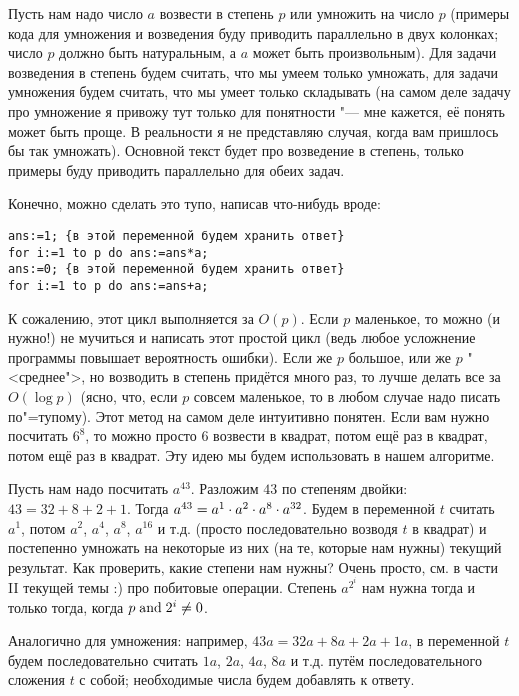 Пусть нам надо число $a$ возвести в степень $p$ или умножить на число $p$ (примеры кода для 
умножения и возведения буду приводить параллельно в двух колонках; число $p$ должно быть 
натуральным, а $a$ может быть произвольным). Для задачи возведения в степень будем считать, что мы умеем 
только умножать, для задачи умножения будем считать, что мы умеет только складывать (на самом деле 
задачу про умножение я привожу тут только для понятности "--- мне кажется, её понять может быть проще. В 
реальности я не представляю случая, когда вам пришлось бы так умножать). Основной текст будет про 
возведение в степень, только примеры буду приводить параллельно для обеих задач.

Конечно, можно сделать это тупо, написав что-нибудь вроде:

\begin{codesample}\begin{verbatim}
ans:=1; {в этой переменной будем хранить ответ}
for i:=1 to p do ans:=ans*a;
ans:=0; {в этой переменной будем хранить ответ}
for i:=1 to p do ans:=ans+a;
\end{verbatim}\end{codesample}

К сожалению, этот цикл выполняется за $O(p)$. Если $p$ маленькое, то можно (и нужно!) не мучиться и написать этот простой цикл 
(ведь любое усложнение программы повышает вероятность ошибки). Если же $p$ большое, или же $p$ 
"<среднее">, но возводить в степень придётся много раз, то лучше делать все за $O(\log p)$ (ясно, что, если $p$ совсем маленькое, то в 
любом случае надо писать по"=тупому). Этот метод на самом деле интуитивно понятен. Если вам нужно посчитать $6^8$, то можно просто $6$ 
возвести в квадрат, потом ещё раз в квадрат, потом ещё раз в квадрат. Эту идею мы будем использовать в нашем алгоритме.

Пусть нам надо посчитать $a^{43}$. Разложим $43$ по степеням двойки: $43 = 32 + 8 + 2 + 1$. Тогда 
$a^{43} \hm= a^1 \cdot a^2 \cdot a^8 \cdot a^{32}$. Будем в переменной $t$ считать $a^1$, потом $a^2$, 
$a^4$, $a^8$, $a^{16}$ и т.д. (просто последовательно возводя $t$ в квадрат) и постепенно 
умножать на некоторые из них (на те, которые нам нужны) текущий результат. Как проверить, 
какие степени нам нужны? Очень просто, см. в части II текущей темы :) про побитовые операции. 
Степень $a^{2^i}$ нам нужна тогда и только тогда, когда $p \mathrel{\mathrm{and}} 2^i \neq 0$.

{\small Аналогично для умножения: например, $43a=32a+8a+2a+1a$, в переменной $t$ будем 
последовательно считать $1a$, $2a$, $4a$, $8a$ и т.д. путём последовательного сложения $t$ с собой; 
необходимые числа будем добавлять к ответу.

}

